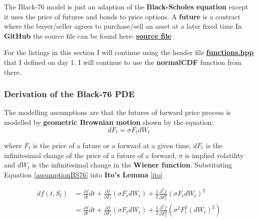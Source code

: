 \documentclass[12pt]{article}
\numberwithin{equation}{section}
\begin{document}
The Black-76 model is just an adaption of the \textbf{Black-Scholes equation} except it uses the price of futures and bonds to price options. \newline A \textbf{future} is a contract where the buyer/seller agrees to purchase/sell an asset at a later fixed time \newline \newline In \textbf{GitHub} the source file can be found here: \href{https://github.com/neeldevsen/one-pricer-a-day/blob/main/day2-black76.cpp}{\textbf{source file}} \newline \newline

For the listings in this section I will continue using the header file \href{https://github.com/neeldevsen/one-pricer-a-day/blob/main/functions.hpp}{\textbf{functions.hpp}} that I defined on day 1.  I will continue to use the \textbf{normalCDF} function from there. 


\subsubsection{Derivation of the Black-76 PDE}
The modelling assumptions are that the futures of forward price process is modelled by \textbf{geometric Brownian motion} shown by the equation:
\begin{equation}
	dF_t = \sigma F_t dW_t
	\label{assumptionBS76}
\end{equation}

where $F_t$ is the price of a future or a forward at a given time, $dF_t$ is the infinitesimal change of the price of a future of a forward, $\sigma$ is implied volatility and $dW_t$ is the infinitesimal change in the \textbf{Wiener function}.\cite{black1976CommodityContracts} \newline\newline
Substituting Equation \ref{assumptionBS76} into \textbf{Ito's Lemma} \ref{ito}

\begin{equation}
	\begin{aligned}
		df(t,S_t) 
		&= \frac{\partial f}{\partial t} dt 
		+ \frac{\partial f}{\partial F_t}(\sigma F_t dW_t) 
		+ \frac{1}{2}\frac{\partial^2 f}{\partial F_t^2}
		(\sigma F_t dW_t)^2 \\ 
		&= \frac{\partial f}{\partial t}dt
		+ \frac{\partial f}{\partial F_t}
		(\sigma F_t dW_t)
		+ \frac{1}{2}
		\frac{\partial^2 f}{\partial F_t^2}
	(\sigma^2F_t^2(dW_t)^2)
	\end{aligned}
	\label{derivationbs76pde}
\end{equation}
\end{document}

